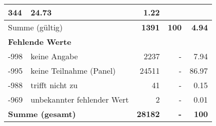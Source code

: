 \begin{longtable}{lXrrr}
       \num{344} &
       \num[round-mode=places,round-precision=2]{24.73} &
         \num[round-mode=places,round-precision=2]{1.22} \\
     \midrule
     \multicolumn{2}{l}{Summe (gültig)} &
       \textbf{\num{1391}} &
     \textbf{100} &
       \textbf{\num[round-mode=places,round-precision=2]{4.94}} \\
     \multicolumn{5}{l}{\textbf{Fehlende Werte}}\\
       -998 &
       keine Angabe &
         \num{2237} &
        - &
         \num[round-mode=places,round-precision=2]{7.94} \\
       -995 &
       keine Teilnahme (Panel) &
         \num{24511} &
        - &
         \num[round-mode=places,round-precision=2]{86.97} \\
       -988 &
       trifft nicht zu &
         \num{41} &
        - &
         \num[round-mode=places,round-precision=2]{0.15} \\
       -969 &
       unbekannter fehlender Wert &
         \num{2} &
        - &
         \num[round-mode=places,round-precision=2]{0.01} \\
     \midrule
     \multicolumn{2}{l}{\textbf{Summe (gesamt)}} &
          \textbf{\num{28182}} &
        \textbf{-} &
        \textbf{100} \\
     \bottomrule
     \end{longtable}
     
